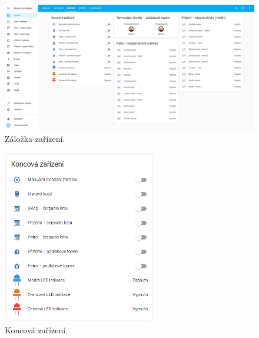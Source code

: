 \begin{Czech}
\begin{figure}[H]
    \centering
    \includegraphics[width=1\textwidth]{pictures/czech/software/tab-devices.png}
    \caption{Záložka zařízení.}
    \label{fig:tab-devices}
\end{figure}
\end{Czech}

\begin{Czech}
\begin{figure}[H]
    \centering
    \includegraphics[width=0.6\textwidth]{pictures/czech/software/end-devices.png}
    \caption{Koncová zařízení.}
    \label{fig:end-devices}
\end{figure}
\end{Czech}

\begin{Czech}
\end{Czech}

